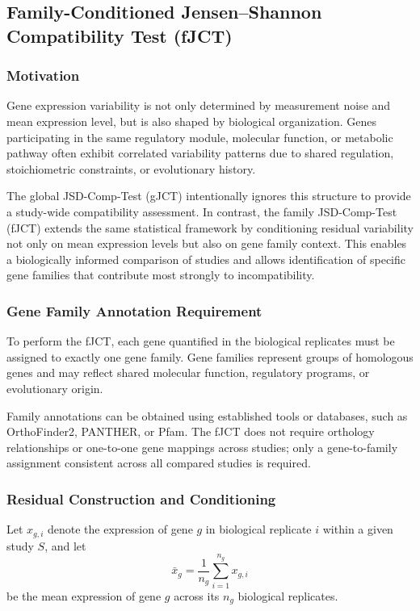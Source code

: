 \subsection{Family-Conditioned Jensen--Shannon Compatibility Test (fJCT)}
\label{ssec:fjct}

\subsubsection{Motivation}

Gene expression variability is not only determined by measurement noise and mean expression level, but is also shaped by biological organization. Genes participating in the same regulatory module, molecular function, or metabolic pathway often exhibit correlated variability patterns due to shared regulation, stoichiometric constraints, or evolutionary history.

The global JSD-Comp-Test (gJCT) intentionally ignores this structure to provide a study-wide compatibility assessment. In contrast, the family JSD-Comp-Test (fJCT) extends the same statistical framework by conditioning residual variability not only on mean expression levels but also on gene family context. This enables a biologically informed comparison of studies and allows identification of specific gene families that contribute most strongly to incompatibility.

\subsubsection{Gene Family Annotation Requirement}

To perform the fJCT, each gene quantified in the biological replicates must be assigned to exactly one gene family. Gene families represent groups of homologous genes and may reflect shared molecular function, regulatory programs, or evolutionary origin.

Family annotations can be obtained using established tools or databases, such as OrthoFinder2, PANTHER, or Pfam. The fJCT does not require orthology relationships or one-to-one gene mappings across studies; only a gene-to-family assignment consistent across all compared studies is required.

\subsubsection{Residual Construction and Conditioning}

Let $x_{g,i}$ denote the expression of gene $g$ in biological replicate $i$ within a given study $S$, and let
\[
\bar{x}_g = \frac{1}{n_g} \sum_{i=1}^{n_g} x_{g,i}
\]
be the mean expression of gene $g$ across its $n_g$ biological replicates.

